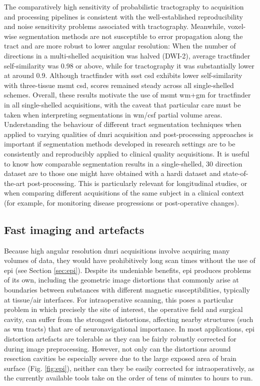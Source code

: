 The comparatively high sensitivity of probabilistic tractography to acquisition and processing pipelines is consistent with the well-established reproducibility and noise sensitivity problems associated with tractography.
Meanwhile, voxel-wise segmentation methods are not susceptible to error propagation along the tract and are more robust to lower angular resolution:
When the number of directions in a multi-shelled acquisition was halved (DWI-2), average tractfinder self-similarity was 0.98 or above, while for tractography it was substantially lower at around 0.9.
Although tractfinder with \gls{ssst} \gls{csd} exhibits lower self-similarity with three-tissue \gls{msmt} \gls{csd}, scores remained steady across all single-shelled schemes.
Overall, these results motivate the use of \gls{msmt} \gls{wm}+\gls{gm} for tractfinder in all single-shelled acquisitions, with the caveat that particular care must be taken when interpreting segmentations in \gls{wm}/\gls{csf} partial volume areas.
Understanding the behaviour of different tract segmentation techniques when applied to varying qualities of \gls{dmri} acquisition and post-processing approaches is important if segmentation methods developed in research settings are to be consistently and reproducibly applied to clinical quality acquisitions.
It is useful to know how comparable segmentation results in a single-shelled, 30 direction dataset are to those one might have obtained with a \gls{hardi} dataset and state-of-the-art post-processing.
This is particularly relevant for longitudinal studies, or when comparing different acquisitions of the same subject in a clinical context (for example, for monitoring disease progressions or post-operative changes).

\subsection{Fast imaging and artefacts}

Because high angular resolution \gls{dmri} acquisitions involve acquiring many volumes of data, they would have prohibitively long scan times without the use of \gls{epi} (see Section \ref{sec:epi}).
Despite its undeniable benefits, \gls{epi} produces problems of its own, including the geometric image distortions that commonly arise at boundaries between substances with different magnetic susceptibilities, typically at tissue/air interfaces.
For intraoperative scanning, this poses a particular problem in which precisely the site of interest, the operative field and surgical cavity, can suffer from the strongest distortions, affecting nearby structures (such as \gls{wm} tracts) that are of neuronavigational importance\autocite{Yang2022}.
In most applications, \gls{epi} distortion artefacts are tolerable as they can be fairly robustly corrected for during image preprocessing.
However, not only can the distortions around resection cavities be especially severe due to the large exposed area of brain surface (Fig. \ref{fig:epi}), neither can they be easily corrected for intraoperatively, as the currently available tools take on the order of tens of minutes to hours to run.

